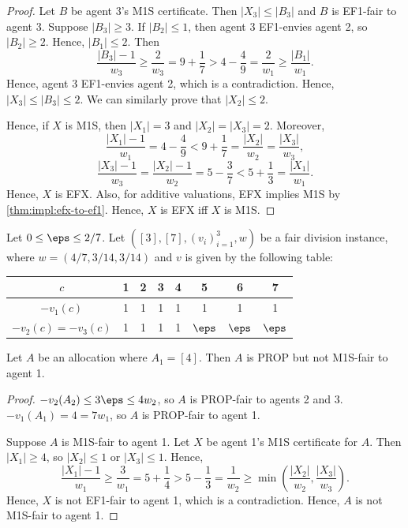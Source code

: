 \begin{proof}
Let $B$ be agent 3's M1S certificate.
Then $|X_3| \le |B_3|$ and $B$ is EF1-fair to agent 3.
Suppose $|B_3| \ge 3$. If $|B_2| \le 1$, then agent 3 EF1-envies agent 2, so $|B_2| \ge 2$.
Hence, $|B_1| \le 2$. Then
\[ \frac{|B_3|-1}{w_3} \ge \frac{2}{w_3} = 9 + \frac{1}{7} > 4 - \frac{4}{9} = \frac{2}{w_1} \ge \frac{|B_1|}{w_1}. \]
Hence, agent 3 EF1-envies agent 2, which is a contradiction.
Hence, $|X_3| \le |B_3| \le 2$.
We can similarly prove that $|X_2| \le 2$.

Hence, if $X$ is M1S, then $|X_1| = 3$ and $|X_2| = |X_3| = 2$. Moreover,
\[ \frac{|X_1|-1}{w_1} = 4 - \frac{4}{9} < 9 + \frac{1}{7} = \frac{|X_2|}{w_2} = \frac{|X_3|}{w_3}, \]
\[ \frac{|X_3|-1}{w_3} = \frac{|X_2|-1}{w_2} = 5 - \frac{3}{7} < 5 + \frac{1}{3} = \frac{|X_1|}{w_1}. \]
Hence, $X$ is EFX. Also, for additive valuations, EFX implies M1S by \cref{thm:impl:efx-to-ef1}.
Hence, $X$ is EFX iff $X$ is M1S.
\end{proof}

\begin{lemma}
\label{cex:prop-not-m1s-chores}
Let $0 \le \eps \le 2/7$.
Let $([3], [7], (v_i)_{i=1}^3, w)$ be a fair division instance,
where $w = (4/7, 3/14, 3/14)$ and $v$ is given by the following table:

\begin{tabular}{cccccccc}
\toprule $c$ & 1 & 2 & 3 & 4 & 5 & 6 & 7
\\\midrule $-v_1(c)$ & 1 & 1 & 1 & 1 & 1 & 1 & 1
\\ $-v_2(c) = -v_3(c)$ & 1 & 1 & 1 & 1 & $\eps$ & $\eps$ & $\eps$
\\\bottomrule
\end{tabular}

Let $A$ be an allocation where $A_1 = [4]$. Then $A$ is PROP but not M1S-fair to agent 1.
\end{lemma}
\begin{proof}
$-v_2(A_2) \le 3\eps \le 4w_2$, so $A$ is PROP-fair to agents 2 and 3.
$-v_1(A_1) = 4 = 7w_1$, so $A$ is PROP-fair to agent 1.

Suppose $A$ is M1S-fair to agent 1.
Let $X$ be agent 1's M1S certificate for $A$.
Then $|X_1| \ge 4$, so $|X_2| \le 1$ or $|X_3| \le 1$. Hence,
\[ \frac{|X_1|-1}{w_1} \ge \frac{3}{w_1} = 5 + \frac{1}{4} > 5 - \frac{1}{3}
= \frac{1}{w_2} \ge \min\left(\frac{|X_2|}{w_2}, \frac{|X_3|}{w_3}\right). \]
Hence, $X$ is not EF1-fair to agent 1, which is a contradiction.
Hence, $A$ is not M1S-fair to agent 1.
\end{proof}

